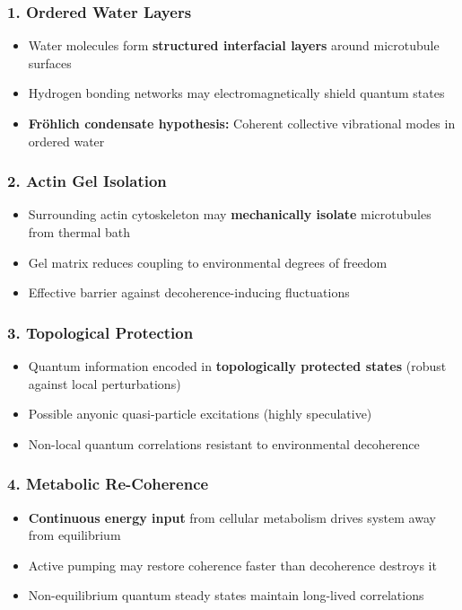 \subsubsection{1. Ordered Water Layers}

\begin{itemize}
\item Water molecules form \textbf{structured interfacial layers} around microtubule surfaces
\item Hydrogen bonding networks may electromagnetically shield quantum states
\item \textbf{Fr\"ohlich condensate hypothesis:} Coherent collective vibrational modes in ordered water
\end{itemize}

\subsubsection{2. Actin Gel Isolation}

\begin{itemize}
\item Surrounding actin cytoskeleton may \textbf{mechanically isolate} microtubules from thermal bath
\item Gel matrix reduces coupling to environmental degrees of freedom
\item Effective barrier against decoherence-inducing fluctuations
\end{itemize}

\subsubsection{3. Topological Protection}

\begin{itemize}
\item Quantum information encoded in \textbf{topologically protected states} (robust against local perturbations)
\item Possible anyonic quasi-particle excitations (highly speculative)
\item Non-local quantum correlations resistant to environmental decoherence
\end{itemize}

\subsubsection{4. Metabolic Re-Coherence}

\begin{itemize}
\item \textbf{Continuous energy input} from cellular metabolism drives system away from equilibrium
\item Active pumping may restore coherence faster than decoherence destroys it
\item Non-equilibrium quantum steady states maintain long-lived correlations
\end{itemize}

